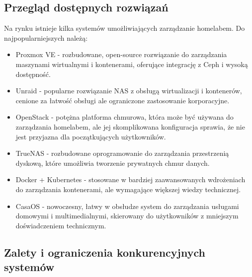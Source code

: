 \subsection{Przegląd dostępnych rozwiązań}
Na rynku istnieje kilka systemów umożliwiających zarządzanie homelabem. Do najpopularniejszych należą:
\begin{itemize}
    \item Proxmox VE \cite{Proxmox} - rozbudowane, open-source rozwiązanie do zarządzania maszynami wirtualnymi i kontenerami, oferujące integrację z Ceph i wysoką dostępność.
    \item Unraid \cite{Unraid} - popularne rozwiązanie NAS z obsługą wirtualizacji i kontenerów, cenione za łatwość obsługi ale ograniczone zastosowanie korporacyjne.
    \item OpenStack \cite{OpenStack} - potężna platforma chmurowa, która może być używana do zarządzania homelabem, ale jej skomplikowana konfiguracja sprawia, że nie jest przyjazna dla początkujących użytkowników.
    \item TrueNAS \cite{TrueNAS} - rozbudowane oprogramowanie do zarządzania przestrzenią dyskową, które umożliwia tworzenie prywatnych chmur danych.
    \item Docker \cite{Docker} + Kubernetes \cite{Kubernetes} - stosowane w bardziej zaawansowanych wdrożeniach do zarządzania kontenerami, ale wymagające większej wiedzy technicznej.
    \item CasaOS \cite{CasaOS} - nowoczesny, łatwy w obsłudze system do zarządzania usługami domowymi i multimedialnymi, skierowany do użytkowników z mniejszym doświadczeniem technicznym.
\end{itemize}

\subsection{Zalety i ograniczenia konkurencyjnych systemów}

